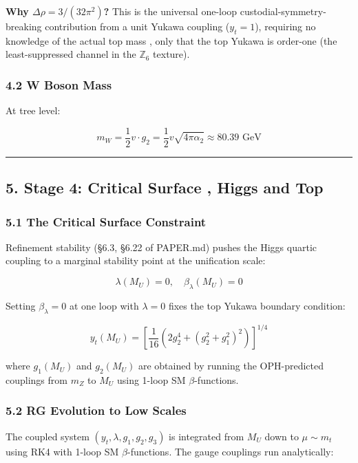 \textbf{Why \(\Delta\rho = 3/(32\pi^2)\)?} This is the universal one-loop custodial-symmetry-breaking contribution from a unit Yukawa coupling (\(y_t = 1\)), requiring no knowledge of the actual top mass , only that the top Yukawa is order-one (the least-suppressed channel in the \(\mathbb{Z}_6\) texture).

\subsubsection{4.2 W Boson Mass}\label{42-w-boson-mass}

At tree level:

\[m_W = \frac{1}{2} v \cdot g_2 = \frac{1}{2} v \sqrt{4\pi\alpha_2} \approx 80.39 \text{ GeV}\]

\begin{center}\rule{0.5\linewidth}{0.5pt}\end{center}

\subsection{5. Stage 4: Critical Surface , Higgs and Top}\label{5-stage-4-critical-surface--higgs-and-top}

\subsubsection{5.1 The Critical Surface Constraint}\label{51-the-critical-surface-constraint}

Refinement stability (§6.3, §6.22 of PAPER.md) pushes the Higgs quartic coupling to a marginal stability point at the unification scale:

\[\lambda(M_U) = 0, \quad \beta_\lambda(M_U) = 0\]

Setting \(\beta_\lambda = 0\) at one loop with \(\lambda = 0\) fixes the top Yukawa boundary condition:

\[y_t(M_U) = \left[\frac{1}{16}\left(2g_2^4 + (g_2^2 + g_1^2)^2\right)\right]^{1/4}\]

where \(g_1(M_U)\) and \(g_2(M_U)\) are obtained by running the OPH-predicted couplings from \(m_Z\) to \(M_U\) using 1-loop SM \(\beta\)-functions.

\subsubsection{5.2 RG Evolution to Low Scales}\label{52-rg-evolution-to-low-scales}

The coupled system \((y_t, \lambda, g_1, g_2, g_3)\) is integrated from \(M_U\) down to \(\mu \sim m_t\) using RK4 with 1-loop SM \(\beta\)-functions. The gauge couplings run analytically:

